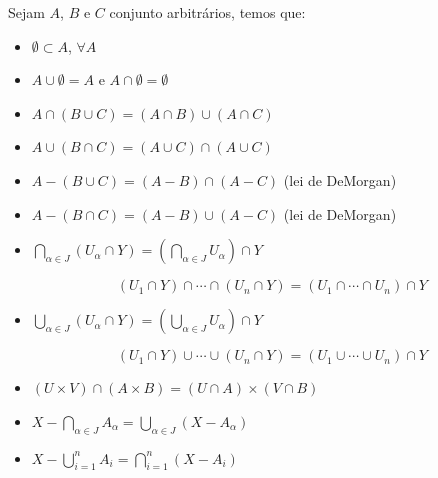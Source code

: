 \begin{prop}
Sejam $A$, $B$ e $C$ conjunto arbitrários, temos que:
\begin{itemize}
 \item $\emptyset \subset A$, $\forall A$
 \item $A \cup \emptyset= A$ e $A \cap \emptyset= \emptyset$
 \item $A \cap (B \cup C) = (A \cap B) \cup (A \cap C)$
 \item $A \cup (B \cap C) = (A \cup C) \cap (A \cup C)$
 \item $A - (B \cup C) = (A - B) \cap (A - C)$ (lei de DeMorgan)
 \item $A - (B \cap C) = (A - B) \cup (A - C)$ (lei de DeMorgan)
 \item $\bigcap_{\alpha \in J}(U_{\alpha} \cap Y) = (\bigcap_{\alpha \in J} U_{\alpha}) \cap Y$
 
  $$(U_1 \cap Y) \cap \cdots \cap (U_n \cap Y) = (U_1 \cap \cdots \cap U_n) \cap Y$$
  
 \item $\bigcup_{\alpha \in J}(U_{\alpha} \cap Y) = (\bigcup_{\alpha \in J} U_{\alpha}) \cap Y$
 
 $$(U_1 \cap Y) \cup \cdots \cup (U_n \cap Y) = (U_1 \cup \cdots \cup U_n) \cap Y$$
 
 \item $(U \times V) \cap (A \times B) = (U \cap A) \times (V \cap B)$
 
 \item $X - \bigcap_{\alpha \in J} A_{\alpha} = \bigcup_{\alpha \in J}(X - A_{\alpha})$
 
 \item $X - \bigcup_{i= 1}^{n} A_i = \bigcap_{i = 1}^{n}(X - A_i)$
 
\end{itemize}
\end{prop}

 


 

 




